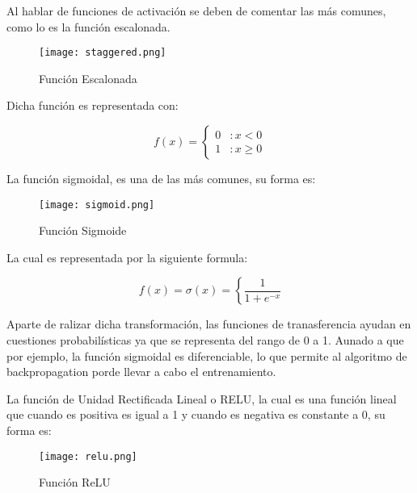                 Al hablar de funciones de activaci\'on se deben de comentar las m\'as comunes, como lo es la 
                funci\'on escalonada.
                
                \begin{figure}[H]
                    \centering
                    \texttt{[image: staggered.png]}
                    \caption{Funci\'on Escalonada}
                    \label{fig:fig4}
                \end{figure}

                Dicha funci\'on es representada con: 
                
                \[f(x) = \left\{ \begin{array}{lr} 0 & : x < 0\\ 1 & : x \ge 0 \end{array} \right. \]

                La funci\'on sigmoidal, es una de las m\'as comunes, su forma es: 

                \begin{figure}[H]
                    \centering
                    \texttt{[image: sigmoid.png]}
                    \caption{Funci\'on Sigmoide}
                    \label{fig:fig5}
                \end{figure}

                La cual es representada por la siguiente formula:

                \[f(x) = \sigma(x) =  \left\{ \frac{1}{1 + e^{-x}} \right. \]

                Aparte de ralizar dicha transformación, las funciones de tranasferencia ayudan en 
                cuestiones probabil\'isticas ya que se representa del rango de 0 a 1.  Aunado a que por ejemplo, la función sigmoidal es diferenciable, lo que permite al algoritmo de backpropagation porde llevar a cabo el entrenamiento.

                La funci\'on de Unidad Rectificada Lineal o RELU, la cual es una funci\'on lineal
                que cuando es positiva es igual a 1 y cuando es negativa es constante a 0, su forma es: \label{subsec: relu}

                \begin{figure}[H]
                    \centering
                    \texttt{[image: relu.png]}
                    \caption{Funci\'on ReLU}
                    \label{fig:fig6}
                \end{figure}

